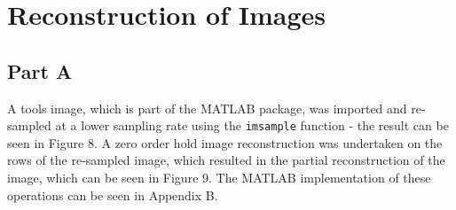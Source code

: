 \documentclass{article}
\begin{document}
\section{Reconstruction of Images}

\subsection{Part A}
A tools image, which is part of the MATLAB package, was imported and re-sampled at a lower sampling rate using the \verb|imsample| function - the result can be seen in Figure 8. A zero order hold image reconstruction was undertaken on the rows of the re-sampled image, which resulted in the partial reconstruction of the image, which can be seen in Figure 9. The MATLAB implementation of these operations can be seen in Appendix B.
\end{document}
